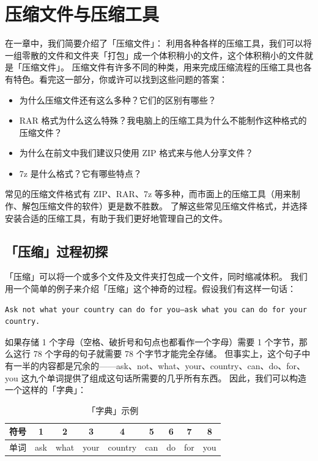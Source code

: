 \chapter{压缩文件与压缩工具}
\label{archive-formats-and-tools}

\begin{intro}
  在一章中，我们简要介绍了「压缩文件」：
  利用各种各样的压缩工具，我们可以将一组零散的文件和文件夹「打包」成一个体积稍小的文件，这个体积稍小的文件就是「压缩文件」。
  压缩文件有许多不同的种类，用来完成压缩流程的压缩工具也各有特色。看完这一部分，你或许可以找到这些问题的答案：
  \begin{itemize}
    \item 为什么压缩文件还有这么多种？它们的区别有哪些？
    \item RAR 格式为什么这么特殊？我电脑上的压缩工具为什么不能制作这种格式的压缩文件？
    \item 为什么在前文中我们建议只使用 ZIP 格式来与他人分享文件？
    \item 7z 是什么格式？它有哪些特点？
  \end{itemize}
\end{intro}

常见的压缩文件格式有 ZIP、RAR、7z 等多种，而市面上的压缩工具（用来制作、解包压缩文件的软件）更是数不胜数。
了解这些常见压缩文件格式，并选择安装合适的压缩工具，有助于我们更好地管理自己的文件。

\section{「压缩」过程初探}

「压缩」可以将一个或多个文件及文件夹打包成一个文件，同时缩减体积。
我们用一个简单的例子来介绍「压缩」这个神奇的过程。假设我们有这样一句话：

\begin{verbatim}
Ask not what your country can do for you—ask what you can do for your country.
\end{verbatim}

如果存储 1 个字母（空格、破折号和句点也都看作一个字母）需要 1 个字节，那么这行 78 个字母的句子就需要 78 个字节才能完全存储。
但事实上，这个句子中有一半的内容都是冗余的——ask、not、what、your、country、can、do、for、you 这九个单词提供了组成这句话所需要的几乎所有东西。
因此，我们可以构造一个这样的「字典」：

\begin{table}[htb!]
  \centering\begin{tabular}{*{9}{c}}
    \toprule
    符号 & 1 & 2 & 3 & 4 & 5 & 6 & 7 & 8 \\
    \midrule
    单词 & ask & what & your & country & can & do & for & you \\
    \bottomrule
  \end{tabular}
  \caption{「字典」示例}
  \label{Compress_Dict}
\end{table}

